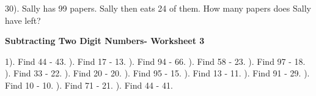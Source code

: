 \documentclass{article}%
\begin{document}
30). Sally has 99 papers. Sally then eats 24 of them. How many papers does Sally have left?%
\newline%
\newline%
\newline%
\pagebreak%
\large%
\begin{center}%
\textbf{Subtracting Two Digit Numbers- Worksheet 3}%
\newline%
\end{center} \normalsize%
1). Find 44 {-} 43.%
\newline%
\newline%
). Find 17 {-} 13.%
\newline%
\newline%
). Find 94 {-} 66.%
\newline%
\newline%
). Find 58 {-} 23.%
\newline%
\newline%
). Find 97 {-} 18.%
\newline%
\newline%
). Find 33 {-} 22.%
\newline%
\newline%
). Find 20 {-} 20.%
\newline%
\newline%
). Find 95 {-} 15.%
\newline%
\newline%
). Find 13 {-} 11.%
\newline%
\newline%
). Find 91 {-} 29.%
\newline%
\newline%
). Find 10 {-} 10.%
\newline%
\newline%
). Find 71 {-} 21.%
\newline%
\newline%
). Find 44 {-} 41.%
\newline%
\end{document}
